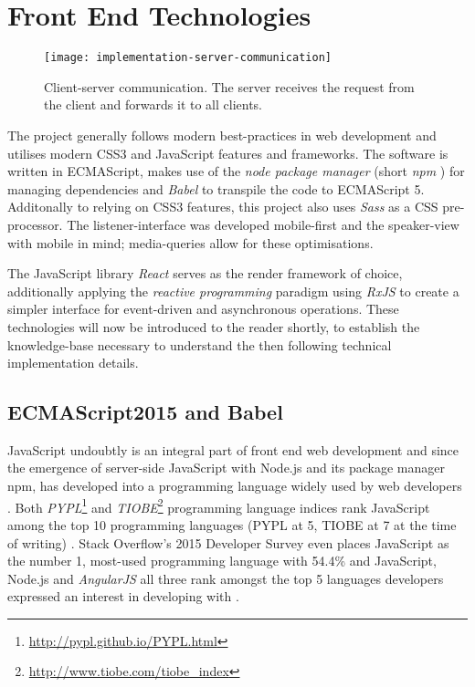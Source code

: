 \section{Front End Technologies}
\label{sec:implementation-technologies}

\begin{figure}
\centering
\texttt{[image: implementation-server-communication]}
\caption{Client-server communication. The server receives the request from the client and forwards it to all clients.}
\label{fig:implementation-client-server-communication}
\end{figure}

The project generally follows modern best-practices in web development and utilises modern CSS3 and JavaScript features and frameworks. The software is written in ECMA\-Script, makes use of the \emph{node package manager} (short \emph{npm} \cite{npm}) for managing dependencies and \emph{Babel} \cite{babel} to transpile the code to ECMA\-Script 5. Additonally to relying on CSS3 features, this project also uses \emph{Sass} \cite{sass} as a CSS pre-processor. The listener-interface was developed mobile-first and the speaker-view with mobile in mind; media-queries allow for these optimisations.

The JavaScript library \emph{React} \cite{react} serves as the render framework of choice, additionally applying the \emph{reactive programming} paradigm using \emph{RxJS} \cite{rxjs} to create a simpler interface for event-driven and asynchronous operations. These technologies will now be introduced to the reader shortly, to establish the knowledge-base necessary to understand the then following technical implementation details.

\subsection{ECMAScript2015 and Babel}
\label{sec:implementation-technologies-es6}
JavaScript undoubtly is an integral part of front end web development and since the emergence of server-side JavaScript with Node.js and its package manager npm, has developed into a programming language widely used by web developers \cite{gpm-meta-transcompiler}. Both \emph{PYPL}\footnote{\url{http://pypl.github.io/PYPL.html}} and \emph{TIOBE}\footnote{\url{http://www.tiobe.com/tiobe_index}} programming language indices rank JavaScript among the top 10 programming languages (PYPL at 5, TIOBE at 7 at the time of writing) \cite{gpm-meta-transcompiler}. Stack Overflow's 2015 Developer Survey even places JavaScript as the number 1, most-used programming language with 54.4\% and JavaScript, Node.js and \emph{AngularJS} \cite{angularjs} all three rank amongst the top 5 languages developers expressed an interest in developing with \cite{stackoverflow-developer-survey}.

